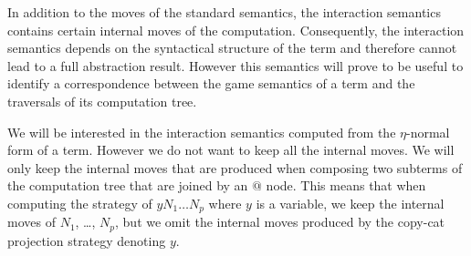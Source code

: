 In addition to the moves of the standard semantics, the interaction semantics contains certain
internal moves of the computation.
Consequently, the interaction semantics depends on the syntactical structure of the term and therefore cannot
lead to a full abstraction result. However this semantics will prove to be useful to identify
a correspondence between the game semantics
of a term and the traversals of its computation tree.

We will be interested in the interaction semantics computed from the
$\eta$-normal form of a term. However we do not want to keep all the internal moves. We will only keep the internal
moves that are produced when composing two subterms of the computation tree that are joined by an $@$ node.
This means that when computing the strategy of
$y N_1 \ldots N_p$ where $y$ is a variable, we keep the internal moves of $N_1$, \ldots, $N_p$, but
we omit the internal moves produced by the copy-cat projection strategy denoting $y$.

